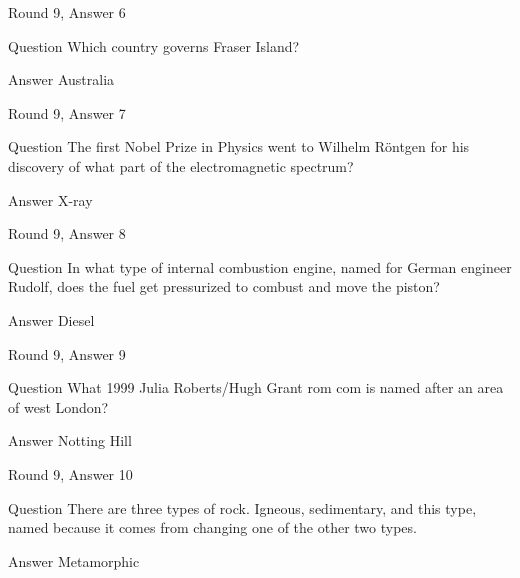 \documentclass[11pt]{beamer}
\begin{document}
\begin{frame}[t]{Round 9, Answer 6}
\vspace{2em}
\begin{block}{Question}
Which country governs Fraser Island\@?
\end{block}
\pause{}
\begin{block}{Answer}
Australia
\end{block}
\end{frame}
    

\begin{frame}[t]{Round 9, Answer 7}
\vspace{2em}
\begin{block}{Question}
The first Nobel Prize in Physics went to Wilhelm Röntgen for his discovery of what part of the electromagnetic spectrum\@?
\end{block}
\pause{}
\begin{block}{Answer}
X-ray
\end{block}
\end{frame}
    

\begin{frame}[t]{Round 9, Answer 8}
\vspace{2em}
\begin{block}{Question}
In what type of internal combustion engine, named for German engineer Rudolf, does the fuel get pressurized to combust and move the piston\@?
\end{block}
\pause{}
\begin{block}{Answer}
Diesel
\end{block}
\end{frame}
    

\begin{frame}[t]{Round 9, Answer 9}
\vspace{2em}
\begin{block}{Question}
What 1999 Julia Roberts/Hugh Grant rom com is named after an area of west London\@?
\end{block}
\pause{}
\begin{block}{Answer}
Notting Hill
\end{block}
\end{frame}
    

\begin{frame}[t]{Round 9, Answer 10}
\vspace{2em}
\begin{block}{Question}
There are three types of rock. Igneous, sedimentary, and this type, named because it comes from changing one of the other two types.
\end{block}
\pause{}
\begin{block}{Answer}
Metamorphic
\end{block}
\end{frame}
    
\end{document}
